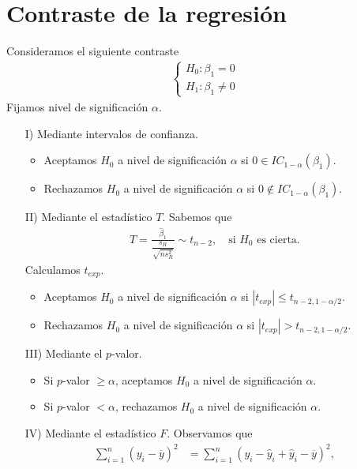 \section{Contraste de la regresión}
\noindent Consideramos el siguiente contraste
\begin{align*}
    \begin{cases}
        H_0 : \beta_1  = 0 \\
        H_1 : \beta_1 \not = 0
    \end{cases}
\end{align*}
Fijamos nivel de significación $\alpha$. 
\begin{enumerate}
    \item[I)] Mediante intervalos de confianza.
    \begin{itemize}
        \item Aceptamos $H_0$ a nivel de significación $\alpha$ si $0 \in IC_{1-\alpha}(\beta_1)$.
        \item Rechazamos $H_0$ a nivel de significación $\alpha$ si $0 \not \in IC_{1-\alpha}(\beta_1)$.
    \end{itemize}
    \item[II)] Mediante el estadístico $T$. Sabemos que
    \begin{align*}
        T = \frac{\widehat{\beta}_1}{\dfrac{s_R}{\sqrt{n s_R^2}}} \sim t_{n-2}, \quad \text{si $H_0$ es cierta}.
    \end{align*}
    Calculamos $t_{exp}$.
    \begin{itemize}
        \item Aceptamos $H_0$ a nivel de significación $\alpha$ si $|t_{exp}| \leq t_{n-2,1-\alpha/2}$.
        \item Rechazamos $H_0$ a nivel de significación $\alpha$ si $|t_{exp}| > t_{n-2,1-\alpha/2}$.
    \end{itemize}
    \item[III)] Mediante el $p$-valor.
    \begin{itemize}
        \item Si $p$-valor $\ge \alpha$, aceptamos $H_0$ a nivel de significación $\alpha$.
        \item Si $p$-valor $< \alpha$, rechazamos $H_0$ a nivel de significación $\alpha$.
    \end{itemize}
    \item[IV)] Mediante el estadístico $F$. Observamos que
    \begin{align*}
        \sum_{i=1}^{n} (y_i - \overline{y})^2 &= \sum_{i=1}^{n} (y_i - \widehat{y}_i + \widehat{y}_i - \overline{y})^2, \\

\end{align*}
\end{enumerate}
